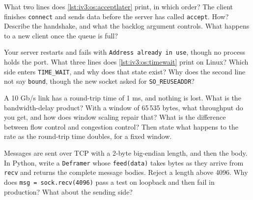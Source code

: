 \begin{question}\label{iq:iv3:operating-systems-concurrency-and-networks:20}
What two lines does \cref{lst:iv3:os:acceptlater} print, in which order? The client finishes \texttt{connect} and sends data before the server has called \texttt{accept}. How? Describe the handshake, and what the backlog argument controls. What happens to a new client once the queue is full?
\label{lst:iv3:os:acceptlater}
\end{question}

\begin{question}\label{iq:iv3:operating-systems-concurrency-and-networks:21}
Your server restarts and fails with \texttt{Address already in use}, though no process holds the port. What three lines does \cref{lst:iv3:os:timewait} print on Linux? Which side enters \texttt{TIME\_WAIT}, and why does that state exist? Why does the second line not say \texttt{bound}, though the new socket asked for \texttt{SO\_REUSEADDR}?
\label{lst:iv3:os:timewait}
\end{question}

\begin{question}\label{iq:iv3:operating-systems-concurrency-and-networks:22}
A 10 Gb/s link has a round-trip time of 1 ms, and nothing is lost. What is the bandwidth-delay product? With a window of 65\,535 bytes, what throughput do you get, and how does window scaling repair that? What is the difference between flow control and congestion control? Then state what happens to the rate as the round-trip time doubles, for a fixed window.
\end{question}

\begin{question}\label{iq:iv3:operating-systems-concurrency-and-networks:23}
Messages are sent over TCP with a 2-byte big-endian length, and then the body. In Python, write a \texttt{Deframer} whose \texttt{feed(data)} takes bytes as they arrive from \texttt{recv} and returns the complete message bodies. Reject a length above 4096. Why does \texttt{msg = sock.recv(4096)} pass a test on loopback and then fail in production? What about the sending side?
\end{question}

